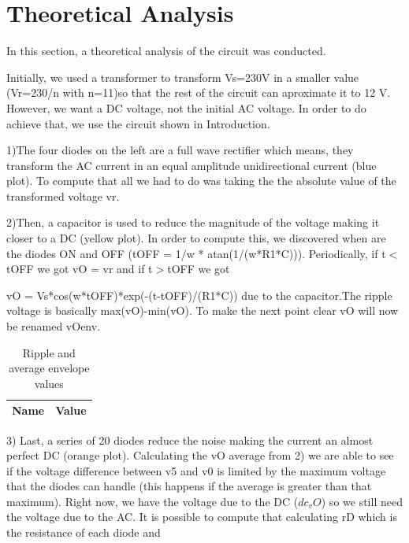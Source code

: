 \section{Theoretical Analysis} \label{section:theo}


\par In this section, a theoretical analysis of the circuit was conducted.

Initially, we used a transformer to transform Vs=230V in a smaller value (Vr=230/n with n=11)so that the rest of the circuit can aproximate it to 12 V. However, we want a DC voltage, not the initial AC voltage. In order to do achieve that, we use the circuit shown in Introduction.

1)The four diodes on the left are a full wave rectifier which means, they transform the AC current in an equal amplitude unidirectional current (blue plot). To compute that all we had to do was taking the the absolute value of the transformed voltage vr.



2)Then, a capacitor is used to reduce the magnitude of the voltage making it closer to a DC (yellow plot). In order to compute this, we discovered when are the diodes ON and OFF (tOFF = 1/w * atan(1/(w*R1*C))). Periodically, if t$<$tOFF we got vO = vr and if t$>$tOFF we got 
\par vO = Vs*cos(w*tOFF)*exp(-(t-tOFF)/(R1*C)) due to the capacitor.The ripple voltage is basically max(vO)-min(vO). To make the next point clear vO will now be renamed vOenv.

\begin{table}[ht]
  \centering
  \begin{tabular}{|l|r|}
    \hline    
    {\bf Name} & {\bf Value} \\ \hline
    
  \end{tabular}
  \caption{Ripple and average envelope values}
  \label{tab:p2}
\end{table}


3) Last, a series of 20 diodes reduce the noise making the current an almost perfect DC (orange plot). Calculating the vO average from 2) we are able to see if the voltage difference between v5 and v0 is limited by the maximum voltage that the diodes can handle (this happens if the average is greater than that maximum). Right now, we have the voltage due to the DC ($dc_vO$) so we still need the voltage due to the AC. It is possible to compute that calculating rD which is the resistance of each diode and 

